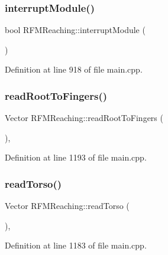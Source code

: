 \subsubsection{\texorpdfstring{interrupt\+Module()}{interruptModule()}}
{\footnotesize\ttfamily bool R\+F\+M\+Reaching\+::interrupt\+Module (\begin{DoxyParamCaption}{ }\end{DoxyParamCaption})\hspace{0.3cm}{\ttfamily [inline]}}



Definition at line 918 of file main.\+cpp.

\mbox{\label{classRFMReaching_a160dd5be2aeca203b1cffcf1ad463de7}} 
\subsubsection{\texorpdfstring{read\+Root\+To\+Fingers()}{readRootToFingers()}}
{\footnotesize\ttfamily Vector R\+F\+M\+Reaching\+::read\+Root\+To\+Fingers (\begin{DoxyParamCaption}{ }\end{DoxyParamCaption})\hspace{0.3cm}{\ttfamily [inline]}, {\ttfamily [private]}}



Definition at line 1193 of file main.\+cpp.

\mbox{\label{classRFMReaching_a3a2a0c8cfdfe016a0f35cc359629f1d0}} 
\subsubsection{\texorpdfstring{read\+Torso()}{readTorso()}}
{\footnotesize\ttfamily Vector R\+F\+M\+Reaching\+::read\+Torso (\begin{DoxyParamCaption}{ }\end{DoxyParamCaption})\hspace{0.3cm}{\ttfamily [inline]}, {\ttfamily [private]}}



Definition at line 1183 of file main.\+cpp.

